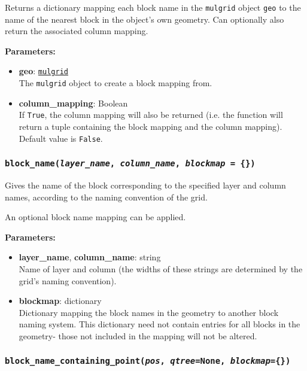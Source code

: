 Returns a dictionary mapping each block name in the \texttt{mulgrid} object \texttt{geo} to the name of the nearest block in the object's own geometry.  Can optionally also return the associated column mapping.

\textbf{Parameters:}
\begin{itemize}
\item \textbf{geo}: \hyperref[mulgrids]{\texttt{mulgrid}}\\
  The \texttt{mulgrid} object to create a block mapping from.
\item \textbf{column\_mapping}: Boolean\\
  If \texttt{True}, the column mapping will also be returned (i.e. the function will return a tuple containing the block mapping and the column mapping).  Default value is \texttt{False}.
\end{itemize}

\begin{snugshade}\subsubsection{\texttt{block\_name(\emph{layer\_name}, \emph{column\_name}, \emph{blockmap} = \{\})}}\end{snugshade}
\label{sec:mulgrid:block_name}

Gives the name of the block corresponding to the specified layer and column names, according to the naming convention of the grid.

An optional block name mapping can be applied.

\textbf{Parameters:}
\begin{itemize}
\item \textbf{layer\_name}, \textbf{column\_name}: string\\
  Name of layer and column (the widths of these strings are determined by the grid's naming convention).
\item \textbf{blockmap}: dictionary\\
  Dictionary mapping the block names in the geometry to another block naming system. This dictionary need not contain entries for all blocks in the geometry- those not included in the mapping will not be altered.
\end{itemize}

\begin{snugshade}\subsubsection{\texttt{block\_name\_containing\_point(\emph{pos}, \emph{qtree}=None, \emph{blockmap}=\{\})}}\end{snugshade}
\label{sec:mulgrid:block_name_containing_point}

